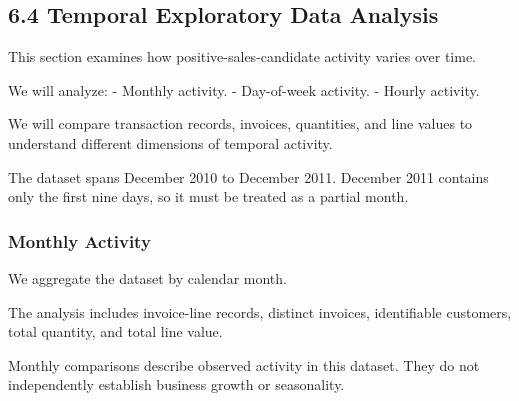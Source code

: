 \documentclass[11pt]{article}
\begin{document}
    
    \subsection{6.4 Temporal Exploratory Data
Analysis}\label{temporal-exploratory-data-analysis}

This section examines how positive-sales-candidate activity varies over
time.

We will analyze: - Monthly activity. - Day-of-week activity. - Hourly
activity.

We will compare transaction records, invoices, quantities, and line
values to understand different dimensions of temporal activity.

The dataset spans December 2010 to December 2011. December 2011 contains
only the first nine days, so it must be treated as a partial month.

    \subsubsection{Monthly Activity}\label{monthly-activity}

We aggregate the dataset by calendar month.

The analysis includes invoice-line records, distinct invoices,
identifiable customers, total quantity, and total line value.

Monthly comparisons describe observed activity in this dataset. They do
not independently establish business growth or seasonality.
\end{document}
